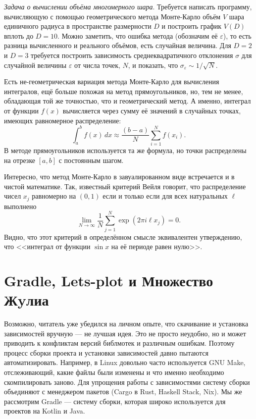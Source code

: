 \documentclass{book}
\begin{document}
\textit{Задача о вычислении объёма многомерного шара}. Требуется написать программу, вычисляющую с
помощью геометрического метода Монте-Карло объём $V$ шара единичного радиуса в пространстве
размерности $D$ и построить график $V(D)$ вплоть до $D = 10$. Можно заметить, что ошибка метода
(обозначим её $\varepsilon$), то есть разница вычисленного и реального объёмов, есть случайная
величина. Для $D = 2$ и $D = 3$ требуется построить зависимость среднеквадратичного отклонения
$\sigma$ для случайной величины $\varepsilon$ от числа точек, $N$, и показать, что
$\sigma_\varepsilon \sim 1 / \sqrt{N}$.

Есть не-геометрическая вариация метода Монте-Карло для вычисления интегралов, ещё больше похожая на
метод прямоугольников, но, тем не менее, обладающая той же точностью, что и геометрический метод. А
именно, интеграл от функции $f(x)$ вычисляется через сумму её значений в случайных точках, имеющих
равномерное распределение:
\begin{equation}
    \int_a^b f(x) \, dx \approx \frac{(b - a)}{N} \sum_{i=1}^N f(x_i).
\end{equation}
В методе прямоугольников используется та же формула, но точки распределены на отрезке $[a, b]$ с
постоянным шагом.

Интересно, что метод Монте-Карло в завуалированном виде встречается и в чистой математике. Так,
известный критерий Вейля говорит, что распределение чисел $x_j$ равномерно на $(0, 1)$ если и
только если для всех натуральных $\ell$ выполнено
\begin{equation}
    \lim_{N \to \infty} \frac{1}{N} \sum_{j = 1}^N \exp(2 \pi i \ell x_j) = 0.
\end{equation}
Видно, что этот критерий в определённом смысле эквивалентен утверждению, что <<интеграл от функции
$\sin x$ на её периоде равен нулю>>.

\clearpage

\section{Gradle, Lets-plot и Множество Жyлиа}

Возможно, читатель уже убедился на личном опыте, что скачивание и установка зависимостей вручную
--- не лучшая идея. Это не просто неудобно, но и может приводить к конфликтам версий библмотек и
различным ошибкам. Поэтому процесс сборки проекта и установки зависимостей давно пытаются
автоматизировать. Например, в Linux довольно часто используется GNU Make, отслеживающий, какие
файлы были изменены и что именно необходимо скомпилировать заново. Для упрощения работы с
зависимостями систему сборки объединяют с менеджером пакетов (Cargo в Rust, Haskell Stack, Nix). Мы
же рассмотрим Gradle --- систему сборки, которая широко используется для проектов на Kotlin и Java.
\end{document}
